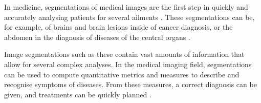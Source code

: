 \documentclass{l4proj}
\begin{document}

    





In medicine, segmentations of medical images are the first step in quickly and accurately analysing patients for several ailments \citep{chen2018drinet}. These segmentations can be, for example, of brains and brain lesions \citep{monteiro2020multiclass} inside of cancer diagnosis, or the abdomen in the diagnosis of diseases of the central organs \citep{Zhao_2021_CVPR}.

Image segmentations such as these contain vast amounts of information that allow for several complex analyses. In the medical imaging field, segmentations can be used to compute quantitative metrics and measures to describe and recognise symptoms of diseases. From these measures, a correct diagnosis can be given, and treatments can be quickly planned \citep{chen2018drinet}.
\end{document}
